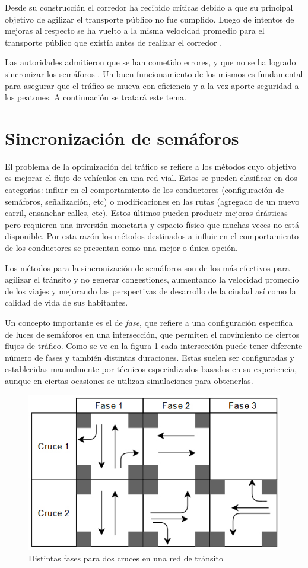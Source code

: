 Desde su construcción el corredor ha recibido críticas debido a que su principal objetivo de agilizar el transporte público no fue cumplido. Luego de intentos de mejoras al respecto se ha vuelto a la misma velocidad promedio para el transporte público que existía antes de realizar el corredor \citep{olivera2015}.

Las autoridades admitieron que se han cometido errores, y que no se ha logrado sincronizar los semáforos \citep{olivera2013}. Un buen funcionamiento de los mismos es fundamental para asegurar que el tráfico se mueva con eficiencia y a la vez aporte seguridad a los peatones. A continuación se tratará este tema. 


\section{Sincronización de semáforos}
El problema de la optimización del tráfico se refiere a los métodos cuyo objetivo es mejorar el flujo de vehículos en una red vial. Estos se pueden clasificar en dos categorías: influir en el comportamiento de los conductores (configuración de semáforos, señalización, etc) o modificaciones en las rutas (agregado de un nuevo carril, ensanchar calles, etc). 
Estos últimos pueden producir mejoras drásticas pero requieren una inversión monetaria y espacio físico que muchas veces no está disponible. Por esta razón los métodos destinados a influir en el comportamiento de los conductores se presentan como una mejor o única opción.

Los métodos para la sincronización de semáforos son de los más efectivos para agilizar el tránsito y no generar congestiones, aumentando la velocidad promedio de los viajes y mejorando las perspectivas de desarrollo de la ciudad así como la calidad de vida de sus habitantes. 

Un concepto importante es el de \emph{fase}, que refiere a una configuración especifica de luces de semáforos en una intersección, que permiten el movimiento de ciertos flujos de tráfico. Como se ve en la figura \ref{fig:fases} cada intersección puede tener diferente número de fases y también distintas duraciones. Estas suelen ser configuradas y establecidas manualmente por técnicos especializados basados en su experiencia, aunque en ciertas ocasiones se utilizan simulaciones para obtenerlas. 

\begin{figure}[H]
	\centering
	\includegraphics[width=0.8\linewidth]{Figures/fases1}
	\caption{Distintas fases para dos cruces en una red de tránsito}
	\label{fig:fases}
\end{figure}

